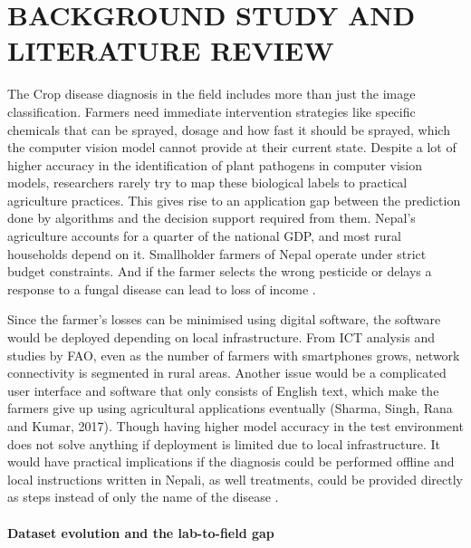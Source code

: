

\chapter{BACKGROUND STUDY AND LITERATURE REVIEW}


The Crop disease diagnosis in the field includes more than just the image classification. Farmers need immediate intervention strategies like specific chemicals that can be sprayed, dosage and how fast it should be sprayed, which the computer vision model cannot provide at their current state. Despite a lot of higher accuracy in the identification of plant pathogens in computer vision models, researchers rarely try to map these biological labels to practical agriculture practices. This gives rise to an application gap between the prediction done by algorithms and the decision support required from them. Nepal's agriculture accounts for a quarter of the national GDP, and most rural households depend on it\parencite{moaldAgricultureStats2080,nsoAgricultureCensus2021}.
Smallholder farmers of Nepal operate under strict budget constraints. And if the farmer selects the wrong pesticide or delays a response to a fungal disease can lead to loss of income \parencite{pandeyCropLossNepal2022}. 

Since the farmer's losses can be minimised using digital software, the software would be deployed depending on local infrastructure. From ICT analysis and studies by FAO, even as the number of farmers with smartphones grows, network connectivity is segmented in rural areas. Another issue would be a complicated user interface and software that only consists of English text, which make the farmers give up using agricultural applications eventually (Sharma, Singh, Rana and Kumar, 2017). Though having higher model accuracy in the test environment does not solve anything if deployment is limited due to local infrastructure. It would have practical implications if the diagnosis could be performed offline and local instructions written in Nepali, as well treatments, could be provided directly as steps instead of only the name of the disease \parencite{silvestriSmallholderTechAdoption2021}.



\subsubsection{Dataset evolution and the lab-to-field gap}

